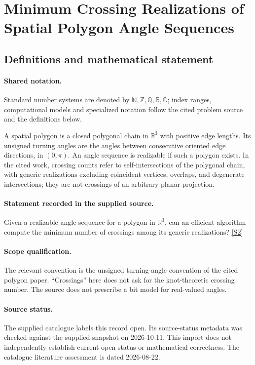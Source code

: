 \documentclass[11pt]{article}
\newcommand{\sref}[2]{\hyperlink{source:#1:#2}{[S#2]}}
\begin{document}
\section{Minimum Crossing Realizations of Spatial Polygon Angle Sequences}\label{statement}

\subsection{Definitions and mathematical statement}

\paragraph{Shared notation.}Standard number systems are denoted by $\mathbb N,\mathbb Z,\mathbb Q,\mathbb R,\mathbb C$; index ranges, computational models and specialized notation follow the cited problem source and the definitions below.


A spatial polygon is a closed polygonal chain in $\mathbb R^3$ with positive edge lengths. Its unsigned turning angles are the angles between consecutive oriented edge directions, in $(0,\pi)$. An angle sequence is realizable if such a polygon exists. In the cited work, crossing counts refer to self-intersections of the polygonal chain, with generic realizations excluding coincident vertices, overlaps, and degenerate intersections; they are not crossings of an arbitrary planar projection.
\paragraph{Statement recorded in the supplied source.}
Given a realizable angle sequence for a polygon in $\mathbb{R}^3$, can an efficient algorithm compute the minimum number of crossings among its generic realizations? \sref{statement}{2}
\paragraph{Scope qualification.}
The relevant convention is the unsigned turning-angle convention of the cited polygon paper. ``Crossings'' here does not ask for the knot-theoretic crossing number. The source does not prescribe a bit model for real-valued angles.
\paragraph{Source status.}
The supplied catalogue labels this record open. Its source-status metadata was checked against the supplied snapshot on 2026-10-11. This import does not independently establish current open status or mathematical correctness. The catalogue literature assessment is dated 2026-08-22.
\end{document}
